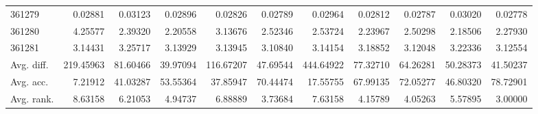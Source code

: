 \begin{tabular}{lrrrrrrrrrr}
361279 & 0.02881 & 0.03123 & 0.02896 & 0.02826 & 0.02789 & 0.02964 & 0.02812 & 0.02787 & 0.03020 & 0.02778 \\
361280 & 4.25577 & 2.39320 & 2.20558 & 3.13676 & 2.52346 & 2.53724 & 2.23967 & 2.50298 & 2.18506 & 2.27930 \\
361281 & 3.14431 & 3.25717 & 3.13929 & 3.13945 & 3.10840 & 3.14154 & 3.18852 & 3.12048 & 3.22336 & 3.12554 \\
Avg. diff. & 219.45963 & 81.60466 & 39.97094 & 116.67207 & 47.69544 & 444.64922 & 77.32710 & 64.26281 & 50.28373 & 41.50237 \\
Avg. acc. & 7.21912 & 41.03287 & 53.55364 & 37.85947 & 70.44474 & 17.55755 & 67.99135 & 72.05277 & 46.80320 & 78.72901 \\
Avg. rank. & 8.63158 & 6.21053 & 4.94737 & 6.88889 & 3.73684 & 7.63158 & 4.15789 & 4.05263 & 5.57895 & 3.00000 \\
\bottomrule
\end{tabular}
